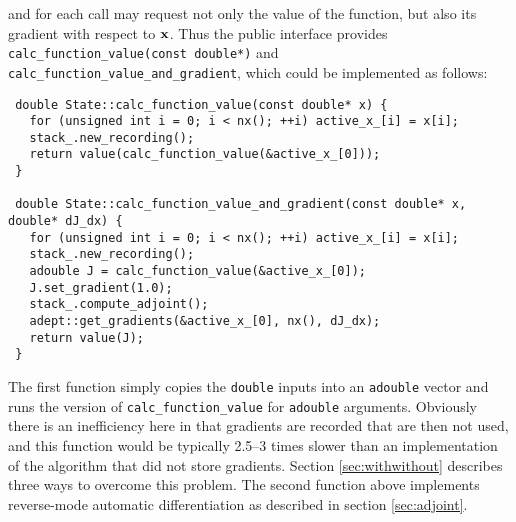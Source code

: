 \documentclass[a4,oneside]{book}
\def\codesize{\small}
\def\x{\ensuremath{{\bf x}}}
\def\code#1{{\codesize\texttt{#1}}}
\begin{document}
and for each call may request not only the value of the function, but
also its gradient with respect to $\x$. Thus the public interface
provides \code{calc\_function\_value(const double*)} and
\code{calc\_function\_value\_and\_gradient}, which could be implemented as
follows:
%
\begin{lstlisting}
 double State::calc_function_value(const double* x) {
   for (unsigned int i = 0; i < nx(); ++i) active_x_[i] = x[i];
   stack_.new_recording();
   return value(calc_function_value(&active_x_[0]));
 }

 double State::calc_function_value_and_gradient(const double* x, double* dJ_dx) {
   for (unsigned int i = 0; i < nx(); ++i) active_x_[i] = x[i];
   stack_.new_recording();
   adouble J = calc_function_value(&active_x_[0]);
   J.set_gradient(1.0);
   stack_.compute_adjoint();
   adept::get_gradients(&active_x_[0], nx(), dJ_dx);
   return value(J);
 }
\end{lstlisting}
%
The first function simply copies the \code{double} inputs into an
\code{adouble} vector and runs the version of
\code{calc\_function\_value} for \code{adouble} arguments. Obviously
there is an inefficiency here in that gradients are recorded that are
then not used, and this function would be typically 2.5--3 times
slower than an implementation of the algorithm that did not store
gradients.  Section \ref{sec:withwithout} describes three ways to
overcome this problem.  The second function above implements
reverse-mode automatic differentiation as described in section
\ref{sec:adjoint}.
\end{document}
